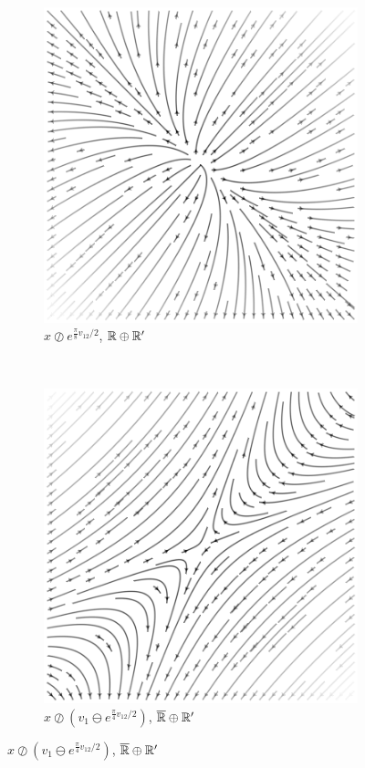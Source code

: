 \documentclass{juliacon}
\begin{document}
\begin{figure}[ht]
	\begin{subfigure}[b]{0.23\textwidth}
		\includegraphics[width=\textwidth]{img/plane-5.png}
		\caption{$x\oslash e^{\frac\pi8 v_{12}/2}$, $\mathbb{R}\oplus\mathbb{R}'$}
	\end{subfigure}
	~
	\begin{subfigure}[b]{0.23\textwidth}
		\includegraphics[width=\textwidth]{img/plane-6.png}
		\caption{$x\oslash(v_1\ominus e^{\frac\pi4 v_{12}/2})$, $\overline{\mathbb{R}}\oplus\mathbb{R}'$}
	\end{subfigure}
\end{figure}
\end{document}
